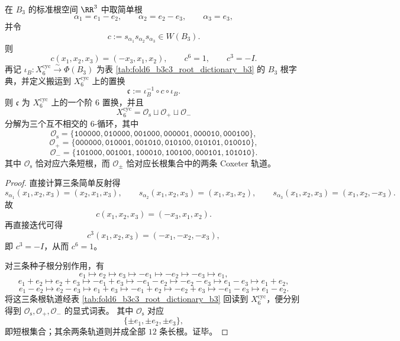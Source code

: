 \begin{theorem}\label{thm:conclusion-window6-coxeter-three-necklace-decomposition}
在 \(B_3\) 的标准根空间 \(\RR^3\) 中取简单根
\[
\alpha_1=e_1-e_2,\qquad \alpha_2=e_2-e_3,\qquad \alpha_3=e_3,
\]
并令
\[
c:=s_{\alpha_1}s_{\alpha_2}s_{\alpha_3}\in W(B_3).
\]
则
\[
c(x_1,x_2,x_3)=(-x_3,x_1,x_2),\qquad c^6=1,\qquad c^3=-I.
\]
再记 \(\iota_B:X_6^{\mathrm{cyc}}\xrightarrow{\sim}\Phi(B_3)\) 为表 \ref{tab:fold6_b3c3_root_dictionary_b3} 的 \(B_3\) 根字典，并定义搬运到 \(X_6^{\mathrm{cyc}}\) 上的置换
\[
\mathfrak c:=\iota_B^{-1}\circ c\circ \iota_B.
\]
则 \(\mathfrak c\) 为 \(X_6^{\mathrm{cyc}}\) 上的一个阶 \(6\) 置换，并且
\[
X_6^{\mathrm{cyc}}=\mathcal O_{\mathrm{s}}\sqcup \mathcal O_{+}\sqcup \mathcal O_{-}
\]
分解为三个互不相交的 \(6\)-循环，其中
\[
\mathcal O_{\mathrm{s}}
=
\{\texttt{100000},\texttt{010000},\texttt{001000},\texttt{000001},\texttt{000010},\texttt{000100}\},
\]
\[
\mathcal O_{+}
=
\{\texttt{000000},\texttt{010001},\texttt{001010},\texttt{010100},\texttt{010101},\texttt{010010}\},
\]
\[
\mathcal O_{-}
=
\{\texttt{101000},\texttt{001001},\texttt{100010},\texttt{100100},\texttt{000101},\texttt{101010}\}.
\]
其中 \(\mathcal O_{\mathrm{s}}\) 恰对应六条短根，而 \(\mathcal O_{\pm}\) 恰对应长根集合中的两条 Coxeter 轨道。
\end{theorem}
\begin{proof}
直接计算三条简单反射得
\[
s_{\alpha_1}(x_1,x_2,x_3)=(x_2,x_1,x_3),\qquad
s_{\alpha_2}(x_1,x_2,x_3)=(x_1,x_3,x_2),\qquad
s_{\alpha_3}(x_1,x_2,x_3)=(x_1,x_2,-x_3).
\]
故
\[
c(x_1,x_2,x_3)=(-x_3,x_1,x_2).
\]
再直接迭代可得
\[
c^3(x_1,x_2,x_3)=(-x_1,-x_2,-x_3),
\]
即 \(c^3=-I\)，从而 \(c^6=1\)。

对三条种子根分别作用，有
\[
e_1\mapsto e_2\mapsto e_3\mapsto -e_1\mapsto -e_2\mapsto -e_3\mapsto e_1,
\]
\[
e_1+e_2\mapsto e_2+e_3\mapsto -e_1+e_3\mapsto -e_1-e_2\mapsto -e_2-e_3\mapsto e_1-e_3\mapsto e_1+e_2,
\]
\[
e_1-e_2\mapsto e_2-e_3\mapsto e_1+e_3\mapsto -e_1+e_2\mapsto -e_2+e_3\mapsto -e_1-e_3\mapsto e_1-e_2.
\]
将这三条根轨道经表 \ref{tab:fold6_b3c3_root_dictionary_b3} 回读到 \(X_6^{\mathrm{cyc}}\)，便分别得到
\(\mathcal O_{\mathrm{s}},\mathcal O_{+},\mathcal O_{-}\) 的显式词表。
其中 \(\mathcal O_{\mathrm{s}}\) 对应
\[
\{\pm e_1,\pm e_2,\pm e_3\},
\]
即短根集合；其余两条轨道则并成全部 \(12\) 条长根。证毕。
\end{proof}

